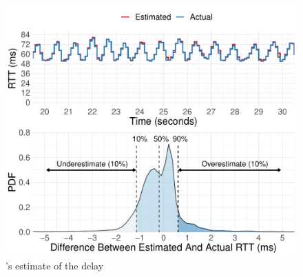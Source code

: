 \begin{figure}[t]
    \centering
\begin{knitrout}
\color{fgcolor}
\includegraphics[width=\maxwidth]{figure/micro_time-delay-1} 

\end{knitrout}

    \caption{\name's estimate of the delay }
    \label{fig:micro:time-delay}
\end{figure}
